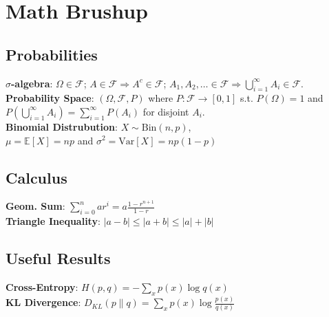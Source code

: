 \section{Math Brushup}
\subsection*{Probabilities}

\textbf{$\sigma$-algebra}: $\Omega\in\mathcal{F}$; $A\in\mathcal{F}\Rightarrow A^c\in\mathcal{F}$; $A_1,A_2,\ldots\in\mathcal{F}\Rightarrow \bigcup_{i=1}^\infty A_i\in\mathcal{F}$.\\

\textbf{Probability Space}: $(\Omega,\mathcal{F},P)$ where $P:\mathcal{F}\rightarrow[0,1]$ s.t. $P(\Omega)=1$ and $P\left(\bigcup_{i=1}^\infty A_i\right)=\sum_{i=1}^\infty P(A_i)$ for disjoint $A_i$.\\

\textbf{Binomial Distrubution}: $X\sim\text{Bin}(n, p)$,\\$\mu=\mathbb{E}\left[X\right]=np$ and $\sigma^2=\text{Var}\left[X\right]=np(1-p)$\\

\subsection*{Calculus}

\textbf{Geom. Sum}: $\sum_{i=0}^{n}ar^i=a\frac{1-r^{n+1}}{1-r}$\\

\textbf{Triangle Inequality}: $|a-b|\leq|a+b|\leq|a|+|b|$\\

\subsection*{Useful Results}

\textbf{Cross-Entropy}: $H(p,q)=-\sum_{x}p(x)\log q(x)$\\

\textbf{KL Divergence}: $D_{KL}(p\|q)=\sum_{x}p(x)\log\frac{p(x)}{q(x)}$\\